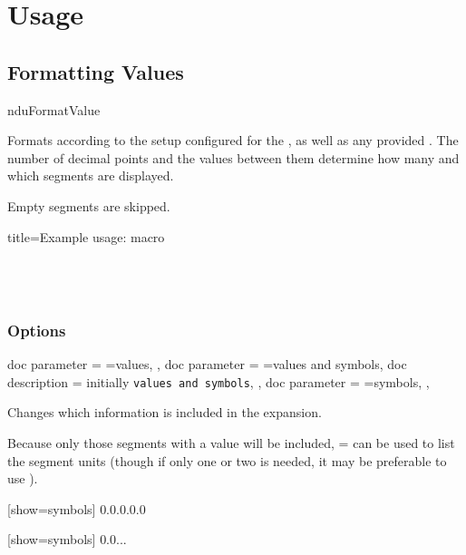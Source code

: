 \documentclass{article}
\begin{document}
\clearpage
\section{Usage} %

\subsection{Formatting Values} %

\begin{docCommand}
	{nduFormatValue}
	{}

Formats  according to the setup configured for the , as well as any provided . The number of decimal points and the values between them determine how many and which segments are displayed.

Empty segments are skipped.
	
\begin{dispExample*}{
	title=Example usage:  macro
}
\\
\\
\\
\\
\end{dispExample*}
\end{docCommand}

\clearpage
\subsubsection{Options}
	
\begin{docKeys}[
		doc name = show,
	]{
		{
			doc parameter = {=values},
		},
		{
			doc parameter = {=values and symbols},
			doc description = initially \texttt{values and symbols},
		},
		{
			doc parameter = {=symbols},
		},
	}

Changes which information is included in the expansion.

Because only those segments with a value will be included, = can be used to list the segment units (though if only one or two is needed, it may be preferable to use ). %

\begin{dispExample}
	[show=symbols]
	{0.0.0.0.0}

	[show=symbols]
	{0.0...}
\end{dispExample}
\end{docKeys}
\end{document}
